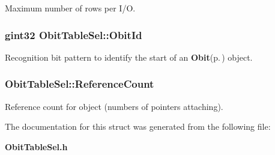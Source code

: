 Maximum number of rows per I/O. 

\subsubsection{\setlength{\rightskip}{0pt plus 5cm}gint32 {\bf Obit\-Table\-Sel::Obit\-Id}}\label{structObitTableSel_o0}


Recognition bit pattern to identify the start of an {\bf Obit}{\rm (p.\,\pageref{structObit})} object. 

\subsubsection{ {\bf Obit\-Table\-Sel::Reference\-Count}}\label{structObitTableSel_o2}


Reference count for object (numbers of pointers attaching). 



The documentation for this struct was generated from the following file:\begin{CompactItemize}
\item 
{\bf Obit\-Table\-Sel.h}\end{CompactItemize}
